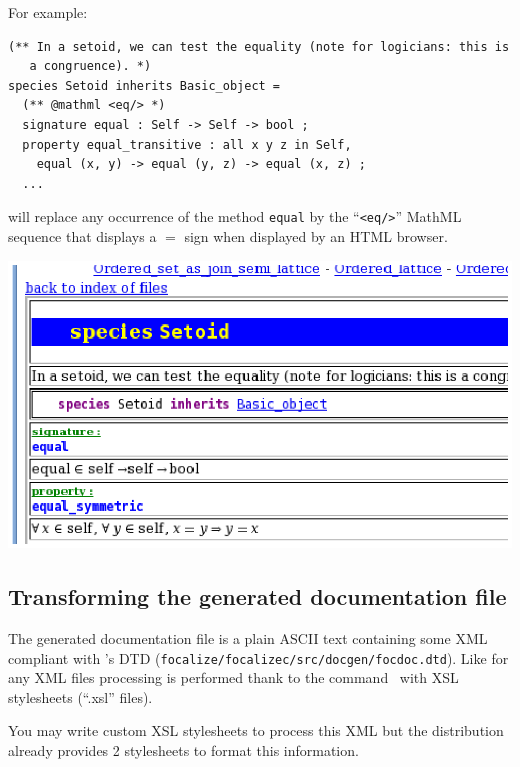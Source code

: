 For example:
{\scriptsize
\begin{lstlisting}
(** In a setoid, we can test the equality (note for logicians: this is
   a congruence). *)
species Setoid inherits Basic_object =
  (** @mathml <eq/> *)
  signature equal : Self -> Self -> bool ;
  property equal_transitive : all x y z in Self,
    equal (x, y) -> equal (y, z) -> equal (x, z) ;
  ...
\end{lstlisting}
}
will replace any occurrence of the method {\tt equal} by the
``\verb+<eq/>+'' MathML sequence that displays a $=$ sign when
displayed by an HTML browser.

\medskip
\includegraphics{mathml_snapshot.ps}



\subsection{Transforming the generated documentation file}
The generated documentation file is a plain ASCII text containing some
XML compliant with \focal's DTD
({\tt focalize/focalizec/src/docgen/focdoc.dtd}). Like for any XML
files processing is performed thank to the command \xsltproc\ with
XSL stylesheets (``.xsl'' files).

You may write custom XSL stylesheets to process this XML but the
distribution already provides 2 stylesheets to format this
information.



